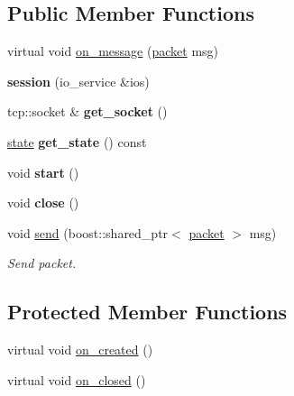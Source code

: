 \subsection*{Public Member Functions}
\begin{DoxyCompactItemize}
\item 
virtual void \mbox{\hyperlink{classmedianet_1_1session_a89428a6c9e2420377a558c60052108d2}{on\+\_\+message}} (\mbox{\hyperlink{classmedianet_1_1packet}{packet}} msg)
\item 
\mbox{\label{classmedianet_1_1session_a52b53e52a2819ec994160f21c5645e7e}} 
{\bfseries session} (io\+\_\+service \&ios)
\item 
\mbox{\label{classmedianet_1_1session_ab6f2854c93b3ded2e4d4c49424a85986}} 
tcp\+::socket \& {\bfseries get\+\_\+socket} ()
\item 
\mbox{\label{classmedianet_1_1session_a0d61472d8b8a47721f0e33ae800b4775}} 
\mbox{\hyperlink{classmedianet_1_1session_a8ebb6f84fba5564ef87d553c6f823f1e}{state}} {\bfseries get\+\_\+state} () const
\item 
\mbox{\label{classmedianet_1_1session_a1cf59767c071f6f583854cc9f0a26f28}} 
void {\bfseries start} ()
\item 
\mbox{\label{classmedianet_1_1session_a355bb5624d3c3954e53c2b33bc46c13b}} 
void {\bfseries close} ()
\item 
void \mbox{\hyperlink{classmedianet_1_1session_a06d3f7ce4d2dca1c9948ff9ae450f25b}{send}} (boost\+::shared\+\_\+ptr$<$ \mbox{\hyperlink{classmedianet_1_1packet}{packet}} $>$ msg)
\begin{DoxyCompactList}\small\item\em Send packet. \end{DoxyCompactList}\end{DoxyCompactItemize}
\subsection*{Protected Member Functions}
\begin{DoxyCompactItemize}
\item 
virtual void \mbox{\hyperlink{classmedianet_1_1session_ae51c3ba72b54e8c894ab87d3521cb8dd}{on\+\_\+created}} ()
\item 
virtual void \mbox{\hyperlink{classmedianet_1_1session_aeac3444d78278559bd2f0b4ac2abf121}{on\+\_\+closed}} ()
\end{DoxyCompactItemize}


